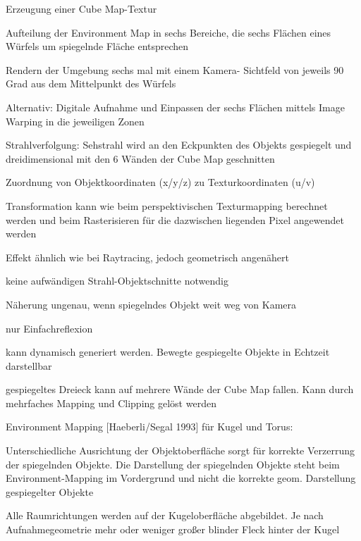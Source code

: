 \documentclass[landscape]{article}
\begin{document}
\begin{multicols}{3}
  Erzeugung einer Cube Map-Textur
  \begin{itemize*}
    \item Aufteilung der Environment Map in sechs Bereiche, die sechs Flächen eines Würfels um spiegelnde Fläche entsprechen
    \item Rendern der Umgebung sechs mal mit einem Kamera- Sichtfeld von jeweils 90 Grad aus dem Mittelpunkt des Würfels
    \item Alternativ: Digitale Aufnahme und Einpassen der sechs Flächen mittels Image Warping in die jeweiligen Zonen
    \item Strahlverfolgung: Sehstrahl wird an den Eckpunkten des Objekts gespiegelt und dreidimensional mit den 6 Wänden der Cube Map geschnitten
    \item Zuordnung von Objektkoordinaten (x/y/z) zu Texturkoordinaten (u/v)
    \item Transformation kann wie beim perspektivischen Texturmapping berechnet werden und beim Rasterisieren für die dazwischen liegenden Pixel angewendet werden
    \item Effekt ähnlich wie bei Raytracing, jedoch geometrisch angenähert
    \item keine aufwändigen Strahl-Objektschnitte notwendig
    \item Näherung ungenau, wenn spiegelndes Objekt weit weg von Kamera
    \item nur Einfachreflexion
    \item kann dynamisch generiert werden. Bewegte gespiegelte Objekte in Echtzeit darstellbar
    \item gespiegeltes Dreieck kann auf mehrere Wände der Cube Map fallen. Kann durch mehrfaches Mapping und Clipping gelöst werden
  \end{itemize*}
  
  Environment Mapping [Haeberli/Segal 1993] für Kugel und Torus: 
  \begin{itemize*}
    \item Unterschiedliche Ausrichtung der Objektoberfläche sorgt für korrekte Verzerrung der spiegelnden Objekte. Die Darstellung der spiegelnden Objekte steht beim Environment-Mapping im Vordergrund und nicht die korrekte geom. Darstellung gespiegelter Objekte
    \item Alle Raumrichtungen werden auf der Kugeloberfläche abgebildet. Je nach Aufnahmegeometrie mehr oder weniger großer blinder Fleck hinter der Kugel
  \end{itemize*}
  

\end{multicols}
\end{document}

